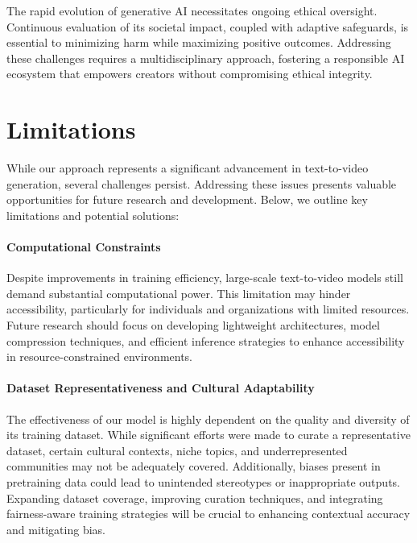 The rapid evolution of generative AI necessitates ongoing ethical oversight. Continuous evaluation of its societal impact, coupled with adaptive safeguards, is essential to minimizing harm while maximizing positive outcomes. Addressing these challenges requires a multidisciplinary approach, fostering a responsible AI ecosystem that empowers creators without compromising ethical integrity.  

\section{Limitations}

While our approach represents a significant advancement in text-to-video generation, several challenges persist. Addressing these issues presents valuable opportunities for future research and development. Below, we outline key limitations and potential solutions:  

\paragraph{Computational Constraints}
Despite improvements in training efficiency, large-scale text-to-video models still demand substantial computational power. This limitation may hinder accessibility, particularly for individuals and organizations with limited resources. Future research should focus on developing lightweight architectures, model compression techniques, and efficient inference strategies to enhance accessibility in resource-constrained environments.  

\paragraph{Dataset Representativeness and Cultural Adaptability} 
The effectiveness of our model is highly dependent on the quality and diversity of its training dataset. While significant efforts were made to curate a representative dataset, certain cultural contexts, niche topics, and underrepresented communities may not be adequately covered. Additionally, biases present in pretraining data could lead to unintended stereotypes or inappropriate outputs. Expanding dataset coverage, improving curation techniques, and integrating fairness-aware training strategies will be crucial to enhancing contextual accuracy and mitigating bias.  

